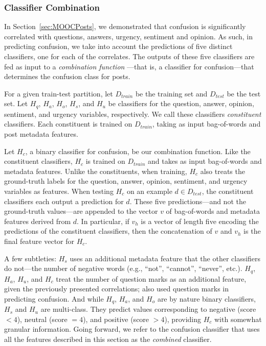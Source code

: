 \documentclass{edm_template}
\begin{document}
\subsubsection{Classifier Combination}
In Section~\ref{sec:MOOCPosts}, we demonstrated that confusion is significantly correlated with questions, answers, urgency, sentiment and opinion. As such, in predicting confusion, we take into account the predictions of five distinct classifiers, one for each of the correlates. The outputs of these five classifiers are fed as input to a \emph{combination function} \cite{bennett2005combination}---that is, a classifier for confusion---that determines the confusion class for posts.

For a given train-test partition, let $D_{train}$ be the training set and $D_{test}$ be the test set. Let $H_{q}$, $H_{a}$, $H_{o}$, $H_{s}$, and $H_{u}$ be classifiers for the question, answer, opinion, sentiment, and urgency variables, respectively. We call these classifiers \emph{constituent} classifiers. Each constituent is trained on $D_{train}$, taking as input bag-of-words and post metadata features.

Let $H_{c}$, a binary classifier for confusion, be our combination function. Like the constituent classifiers, $H_{c}$ is trained on $D_{train}$ and takes as input bag-of-words and metadata features. Unlike the constituents, when training, $H_{c}$ also treats the ground-truth labels for the question, answer, opinion, sentiment, and urgency variables as features. When testing $H_{c}$ on an example $d \in D_{test}$, the constituent classifiers each output a prediction for $d$. These five predictions---and not the ground-truth values---are appended to the vector $v$ of bag-of-words and metadata features derived from $d$. In particular, if $v_{h}$ is a vector of length five encoding the predictions of the constituent classifiers, then the concatenation of $v$ and $v_{h}$ is the final feature vector for $H_{c}.$

A few subtleties: $H_{s}$ uses an additional metadata feature that the other classifiers do not---the number of negative words (e.g., ``not'', ``cannot'', ``never'', etc.). $H_{q}$, $H_{a}$, $H_{u}$, and $H_{c}$ treat the number of question marks as an additional feature, given the previously presented correlations; \cite{wen2015confusion} also used question marks in predicting confusion. And while $H_{q}$, $H_{a}$, and $H_{o}$ are by nature binary classifiers, $H_{s}$ and $H_{u}$ are multi-class. They predict values corresponding to negative (score $< 4$), neutral (score $= 4$), and positive (score $> 4$), providing $H_{c}$ with somewhat granular information. Going forward, we refer to the confusion classifier that uses all the features
described in this section as the \emph{combined} classifier. 
\end{document}
